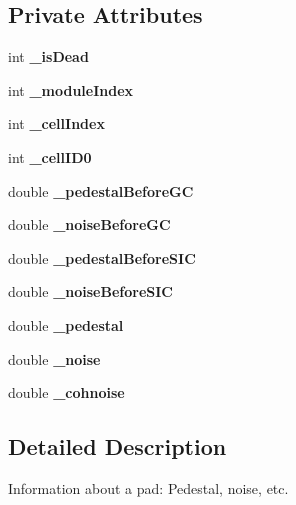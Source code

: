 \subsection*{Private Attributes}
\begin{DoxyCompactItemize}
\item 
int {\bfseries \-\_\-is\-Dead}\label{classCALICE_1_1NoiseParameter_a03f4de43745541be50a09781b8e89839}

\item 
int {\bfseries \-\_\-module\-Index}\label{classCALICE_1_1NoiseParameter_a6a940aaa8b66a7bc9eb0153733c42b86}

\item 
int {\bfseries \-\_\-cell\-Index}\label{classCALICE_1_1NoiseParameter_a2c43ce031c49e48559f6aa01c6836012}

\item 
int {\bfseries \-\_\-cell\-I\-D0}\label{classCALICE_1_1NoiseParameter_ad617a135ebfd7e49a17101d2911b06fc}

\item 
double {\bfseries \-\_\-pedestal\-Before\-G\-C}\label{classCALICE_1_1NoiseParameter_a84581448f67828307fda00d2cfd39c85}

\item 
double {\bfseries \-\_\-noise\-Before\-G\-C}\label{classCALICE_1_1NoiseParameter_af097bce79566b82d2e920439cfd94cd1}

\item 
double {\bfseries \-\_\-pedestal\-Before\-S\-I\-C}\label{classCALICE_1_1NoiseParameter_af7aa0d50c9a7656f7e4965e9dabfa1bd}

\item 
double {\bfseries \-\_\-noise\-Before\-S\-I\-C}\label{classCALICE_1_1NoiseParameter_ac554d0afad408a3aed8e3a521ee8c466}

\item 
double {\bfseries \-\_\-pedestal}\label{classCALICE_1_1NoiseParameter_a6b4a80837d89299a9319157aab127a28}

\item 
double {\bfseries \-\_\-noise}\label{classCALICE_1_1NoiseParameter_a48f6d0c4bc54f23e4e58df5da2bcc5f4}

\item 
double {\bfseries \-\_\-cohnoise}\label{classCALICE_1_1NoiseParameter_ae362643e5670037960a664be7d8c4635}

\end{DoxyCompactItemize}


\subsection{Detailed Description}
Information about a pad\-: Pedestal, noise, etc. 

